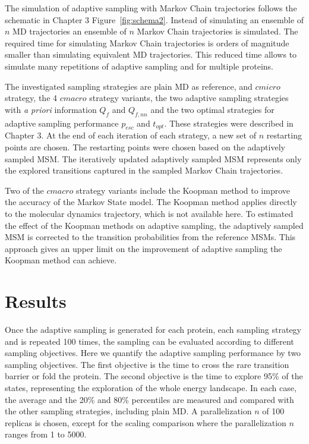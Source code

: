 The simulation of adaptive sampling with Markov Chain trajectories follows the schematic in Chapter 3 Figure~\ref{fig:schema2}. 
Instead of simulating an ensemble of $n$ MD trajectories an ensemble of $n$ Markov Chain trajectories is simulated. The required time for simulating Markov Chain trajectories is orders of magnitude smaller than simulating equivalent MD trajectories. This reduced time allows to simulate many repetitions of adaptive sampling and for multiple proteins.

The investigated sampling strategies are plain MD as reference, and $cmicro$ strategy, the 4 $cmacro$ strategy variants, the two adaptive sampling strategies with \emph{a priori} information $Q_{f}$ and $Q_{f,nn}$ and the two optimal strategies for adaptive sampling performance $p_{esc}$ and $t_{opt}$.  These strategies were described in Chapter 3.
At the end of each iteration of each strategy, a new set of $n$ restarting points are chosen. The restarting points were chosen based on the adaptively sampled MSM. The iteratively updated adaptively sampled MSM represents only the explored transitions captured in the sampled Markov Chain trajectories. 

Two of the $cmacro$ strategy variants include the Koopman method to improve the accuracy of the Markov State model. The Koopman method applies directly to the molecular dynamics trajectory, which is not available here. To estimated the effect of the Koopman methods on adaptive sampling, the adaptively sampled MSM is corrected to the transition probabilities from the reference MSMs. This approach gives an upper limit on the improvement of adaptive sampling the Koopman method can achieve. 


\section{\label{sec:results}Results}

Once the adaptive sampling is generated for each protein, each sampling strategy and is repeated 100 times, the sampling can be evaluated according to different sampling objectives.
Here we quantify the adaptive sampling performance by two sampling objectives. The first objective is the time to cross the rare transition barrier or fold the protein. The second objective is the time to explore 95\% of the states, representing the exploration of the whole energy landscape.
In each case, the average and the 20\% and 80\% percentiles are measured and compared with the other sampling strategies, including plain MD. A parallelization $n$ of 100 replicas is chosen, except for the scaling comparison where the parallelization $n$ ranges from 1 to 5000. 

